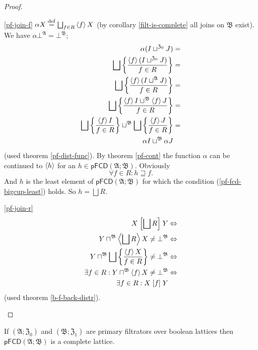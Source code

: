 \begin{proof}
~
\begin{widedisorder}
\item [{\ref{pf-join-f}}] $\alpha X\overset{\mathrm{def}}{=}\bigsqcup_{f\in R}\left\langle f\right\rangle X$
(by corollary \ref{filt-is-complete} all joins on $\mathfrak{B}$
exist). We have $\alpha\bot^{\mathfrak{A}}=\bot^{\mathfrak{B}}$;
\begin{align*}
\alpha(I\sqcup^{\mathfrak{Z}_{0}}J) & =\\
\bigsqcup\left\{ \frac{\left\langle f\right\rangle(I\sqcup^{\mathfrak{Z}_{0}}J)}{f\in R}\right\} & =\\
\bigsqcup\left\{ \frac{\left\langle f\right\rangle(I\sqcup^{\mathfrak{A}}J)}{f\in R}\right\} & =\\
\bigsqcup\left\{ \frac{\left\langle f\right\rangle I\sqcup^{\mathfrak{B}}\left\langle f\right\rangle J}{f\in R}\right\} & =\\
\bigsqcup\left\{ \frac{\left\langle f\right\rangle I}{f\in R}\right\}\sqcup^{\mathfrak{B}}\bigsqcup\left\{ \frac{\left\langle f\right\rangle J}{f\in R}\right\} & =\\
\alpha I\sqcup^{\mathfrak{B}}\alpha J
\end{align*}
(used theorem \ref{pf-dist-func}). By theorem \ref{pf-cont} the
function $\alpha$ can be continued to $\left\langle h\right\rangle$ for an $h\in\mathsf{pFCD}(\mathfrak{A};\mathfrak{B})$.
Obviously
\begin{equation}
\forall f\in R:h\sqsupseteq f.\label{pf-fcd-bigcup-least}
\end{equation}
And $h$ is the least element of $\mathsf{pFCD}(\mathfrak{A};\mathfrak{B})$
for which the condition (\ref{pf-fcd-bigcup-least}) holds. So $h=\bigsqcup R$.

\begin{widedisorder}
\item [{\ref{pf-join-r}}] ~
\begin{align*}
X\mathrel{\left[\bigsqcup R\right]}Y & \Leftrightarrow\\
Y\sqcap^{\mathfrak{B}}\left\langle \bigsqcup R\right\rangle X\ne\bot^{\mathfrak{B}} & \Leftrightarrow\\
Y\sqcap^{\mathfrak{B}}\bigsqcup\left\{ \frac{\left\langle f\right\rangle X}{f\in R}\right\}\ne\bot^{\mathfrak{B}} & \Leftrightarrow\\
\exists f\in R:Y\sqcap^{\mathfrak{B}}\left\langle f\right\rangle X\ne\bot^{\mathfrak{B}} & \Leftrightarrow\\
\exists f\in R:X\mathrel{\left[f\right]}Y
\end{align*}
(used theorem \ref{b-f-back-distr}).
\end{widedisorder}
\end{widedisorder}
\end{proof}
\begin{cor}
\label{pf-fcd-compl}If $(\mathfrak{A};\mathfrak{Z}_{0})$ and $(\mathfrak{B};\mathfrak{Z}_{1})$
are primary filtrators over boolean lattices then $\mathsf{pFCD}(\mathfrak{A};\mathfrak{B})$
is a complete lattice.\end{cor}
